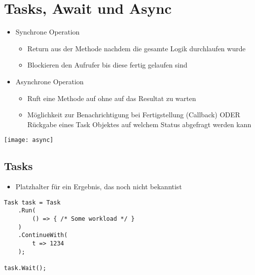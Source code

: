 \section{Tasks, Await und Async}

\begin{multicols*}{2}
\begin{itemize}
    \item Synchrone Operation
    \begin{itemize}
        \item Return aus der Methode nachdem die gesamte Logik durchlaufen wurde
        \item Blockieren den Aufrufer bis diese fertig gelaufen sind
    \end{itemize}
    \item Asynchrone Operation
    \begin{itemize}
        \item Ruft eine Methode auf ohne auf das Resultat zu warten
        \item Möglichkeit zur Benachrichtigung bei Fertigstellung (Callback) ODER Rückgabe eines Task Objektes auf welchem Status abgefragt werden kann
    \end{itemize}
\end{itemize}
\texttt{[image: async]}
\subsection{Tasks}
\begin{itemize}
    \item Platzhalter für ein Ergebnis, das noch nicht bekanntist
\end{itemize}
\begin{lstlisting}
Task task = Task
    .Run(
        () => { /* Some workload */ }
    )
    .ContinueWith( 
        t => 1234
    );

task.Wait();
\end{lstlisting}

\end{multicols*}
